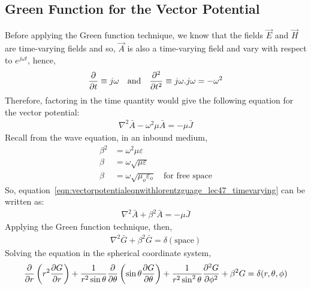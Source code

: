 \subsection{Green Function for the Vector Potential}
Before applying the Green function technique, we know that the fields $\vec{E}$ and $\vec{H}$ are time-varying fields and so, $\vec{A}$ is also a time-varying field and vary with respect to $e^{j\omega t}$, hence,
\begin{align*}
\partialderivative{}{t} \equiv j\omega\quad\text{and}\quad\partialderivative[2]{}{t} \equiv j\omega.j\omega = -\omega^{2}
\end{align*}
Therefore, factoring in the time quantity would give the following equation for the vector potential:
\begin{align}
\nabla^{2}\bar{A}-\omega^{2}\mu\bar{A} = -\mu\bar{J}
\label{eqn:vectorpotentialeqnwithlorentzguage_lec47_timevarying}
\end{align}
Recall from the wave equation, in an inbound medium,
\begin{align*}
\beta^{2} &= \omega^{2}\mu \varepsilon\\
\beta &= \omega\sqrt{\mu \varepsilon}\\
\beta &= \omega\sqrt{\mu_o \varepsilon_o}\quad\text{for free space}
\end{align*}
So, equation~\eqref{eqn:vectorpotentialeqnwithlorentzguage_lec47_timevarying} can be written as:
\begin{align*}
\nabla^{2}\bar{A}+\beta^{2}\bar{A} = -\mu\bar{J}
\end{align*}
Applying the Green function technique, then,
\begin{align*}
\nabla^{2}\bar{G}+\beta^{2}\bar{G} = \delta(\text{space})
\end{align*}
Solving the equation in the spherical coordinate system,
\begin{dmath*}
\partialderivative{}{r} \left(r^{2} \partialderivative{G}{r} \right) + \frac{1}{r^2 \sin \theta} \partialderivative{}{\theta}\left(\sin \theta \partialderivative{G}{\theta}\right) + \frac{1}{r^{2}\sin^{2}\theta} \partialderivative[2]{G}{\phi} + \beta^{2}G = \delta(r,\theta,\phi)
\end{dmath*}

